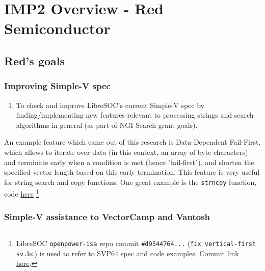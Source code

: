 \section{IMP2 Overview - Red Semiconductor}

\subsection{Red's goals}

\subsubsection{Improving Simple-V spec}

\begin{enumerate}
  \item To check and improve LibreSOC's current Simple-V spec by finding/implementing
  new features relevant to processing strings and search algorithms in general
  (as part of NGI Search grant goals).
\end{enumerate}

An example feature which came out of this research is
Data-Dependent Fail-First, which allows to iterate over data (in
this context, an array of byte characters) and terminate early when
a condition is met (hence "fail-first"), and shorten the specified
vector length based on this early termination. This feature is very useful
for string search and copy functions. One great example is the \texttt{strncpy}
function, code \href{https://git.libre-soc.org/?p=openpower-isa.git;a=blob;f=src/openpower/decoder/isa/test_caller_svp64_ldst.py;h=4ecf534777a5e8a0178b29dbcd69a1a5e2dd14d6;hb=d9544764b1710f3807a9c0685d150a665f70b9a2#l31}{here}
\footnote{LibreSOC \texttt{openpower-isa} repo commit \texttt{\#d9544764...}
(\texttt{fix vertical-first sv.bc}) is used to refer to
SVP64 spec and code examples. Commit link
\href{https://git.libre-soc.org/?p=openpower-isa.git;a=commit;h=d9544764b1710f3807a9c0685d150a665f70b9a2}{here}.}

\subsubsection{Simple-V assistance to VectorCamp and Vantosh}


